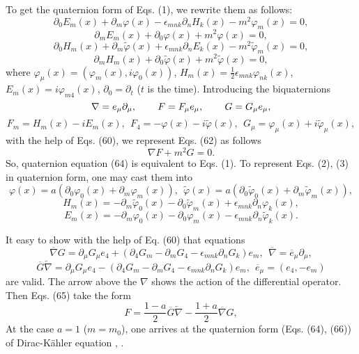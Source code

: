 \documentclass[a4paper,12pt]{article}
\begin{document}
To get the quaternion form of Eqs. (1), we rewrite them as
follows:
\[
\partial _0 E_m(x)+\partial _m \varphi (x)-\epsilon_{mnk}\partial_n H_k (x)
 -m^2\varphi _m (x)=0 ,
\]
\[
\partial _m E_m(x)+\partial _0 \varphi (x)+m^2\varphi (x)=0 ,
\]
\vspace{-7mm}
\begin{equation}
\label{62}
\end{equation}
\vspace{-7mm}
\[
\partial _0 H_m(x)+\partial _m \widetilde{\varphi}(x)+\epsilon_{mnk}
\partial_n E_k (x)-m^2\widetilde{\varphi} _m (x)=0 ,
\]
\[
\partial _m H_m(x)+\partial _0 \widetilde{\varphi}
(x)+m^2\widetilde{\varphi}(x)=0 ,
\]
where $\varphi _\mu (x)=(\varphi _m (x), i\varphi _0 (x))$, $H_m
(x)=\frac 12\epsilon _{mnk}\varphi _{nk}(x)$, $E_m (x)=i\varphi
_{m4}(x)$, $\partial _0=\partial _t$ ($t$ is the time).
Introducing the biquaternions
\[
\nabla =e_\mu \partial _\mu ,\hspace{0.3in}F=F_\mu e_\mu
,\hspace{0.3in} G=G_\mu e_\mu ,
\]
\vspace{-7mm}
\begin{equation}
\label{63}
\end{equation}
\vspace{-7mm}
\[
F_m=H_m (x)-iE_m (x) ,~~F_4=-\varphi (x)-i\widetilde{\varphi}
(x),~~G_\mu =\varphi_\mu (x)+i\widetilde{\varphi}_\mu (x) ,
\]
with the help of Eqs. (60), we represent Eqs. (62) as follows
\begin{equation}
\nabla F+m^2G=0 .   \label{64}
\end{equation}
So, quaternion equation (64) is equivalent to Eqs. (1). To
represent Eqs. (2), (3) in quaternion form, one may cast them into
\[
\varphi (x)=a\left(\partial _0 \varphi_0 (x)+\partial_m \varphi _m
(x)\right) ,~~\widetilde{\varphi} (x)=a\left(\partial _0
\widetilde{\varphi}_0 (x)+\partial_m \widetilde{\varphi} _m
(x)\right) ,
\]
\begin{equation}
H_m(x)=-\partial _m \widetilde{\varphi}_0 (x)-\partial_0
\widetilde{\varphi} _m (x)+\epsilon_{mnk}\partial_n \varphi_k (x)
, \label{65}
\end{equation}
\[
E_m(x)=-\partial _m \varphi_0 (x)-\partial_0 \varphi _m
(x)-\epsilon_{mnk}\partial_n \widetilde{\varphi}_k (x) .
\]

It easy to show with the help of Eq. (60) that equations
\[
\overline{\nabla }G=\partial_\mu G_\mu e_4+\left(\partial_4 G_m
-\partial_m G_4 -\epsilon_{mnk}\partial_n G_k \right)e_m
,~~\overline{\nabla }=\overline{e}_\mu \partial _\mu ,
\]
\[
\overline{G}\overleftarrow{\nabla}=\partial_\mu G_\mu
e_4-\left(\partial_4 G_m -\partial_m G_4 -\epsilon_{mnk}\partial_n
G_k \right)e_m ,~~\overline{e} _\mu =(e_4,-e_m)
\]
are valid. The arrow above the $\nabla$ shows the action of the
differential operator. Then Eqs. (65) take the form
\begin{equation}
F=\frac{1-a}{2}\overline{G}\overleftarrow{\nabla}-\frac{1+a}{2}\overline{\nabla
}G  , \label{66}
\end{equation}
At the case $a=1$ ($m=m_0$), one arrives at the quaternion form
(Eqs. (64), (66)) of Dirac-K\"{a}hler equation \cite{Kruglov1},
\cite{monogr}.
\end{document}
